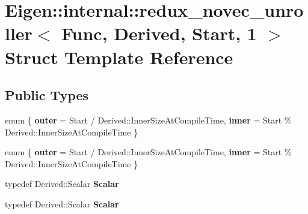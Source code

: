 \hypertarget{struct_eigen_1_1internal_1_1redux__novec__unroller_3_01_func_00_01_derived_00_01_start_00_011_01_4}{}\section{Eigen\+:\+:internal\+:\+:redux\+\_\+novec\+\_\+unroller$<$ Func, Derived, Start, 1 $>$ Struct Template Reference}
\label{struct_eigen_1_1internal_1_1redux__novec__unroller_3_01_func_00_01_derived_00_01_start_00_011_01_4}
\subsection*{Public Types}
\begin{DoxyCompactItemize}
\item 
\mbox{\label{struct_eigen_1_1internal_1_1redux__novec__unroller_3_01_func_00_01_derived_00_01_start_00_011_01_4_a8f47ce8078a10f90913933476a3bef9a}} 
enum \{ {\bfseries outer} = Start / Derived\+:\+:Inner\+Size\+At\+Compile\+Time, 
{\bfseries inner} = Start \% Derived\+:\+:Inner\+Size\+At\+Compile\+Time
 \}
\item 
\mbox{\label{struct_eigen_1_1internal_1_1redux__novec__unroller_3_01_func_00_01_derived_00_01_start_00_011_01_4_a7aa75ba77203d2841534345f0cf41a84}} 
enum \{ {\bfseries outer} = Start / Derived\+:\+:Inner\+Size\+At\+Compile\+Time, 
{\bfseries inner} = Start \% Derived\+:\+:Inner\+Size\+At\+Compile\+Time
 \}
\item 
\mbox{\label{struct_eigen_1_1internal_1_1redux__novec__unroller_3_01_func_00_01_derived_00_01_start_00_011_01_4_a0ef89651eff09a03c2d3efbcaee49593}} 
typedef Derived\+::\+Scalar {\bfseries Scalar}
\item 
\mbox{\label{struct_eigen_1_1internal_1_1redux__novec__unroller_3_01_func_00_01_derived_00_01_start_00_011_01_4_a0ef89651eff09a03c2d3efbcaee49593}} 
typedef Derived\+::\+Scalar {\bfseries Scalar}
\end{DoxyCompactItemize}

